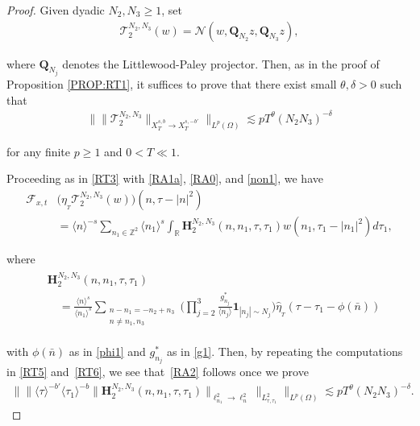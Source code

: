 \documentclass[%
11pt,  reqno]{amsart}
\newcommand{\1}{\hspace{0.2mm}\text{I}\hspace{0.2mm}}
\newcommand{\noi}{\noindent}
\newcommand{\Z}{\mathbb{Z}}
\newcommand{\R}{\mathbb{R}}
\newcommand{\Q}{\mathbf{Q}}
\newcommand{\F}{\mathcal{F}}
\newcommand{\dl}{\delta}
\newcommand{\ft}{\widehat}
\newcommand{\ta}{\theta}
\renewcommand{\l}{\ell}
\renewcommand{\O}{\Omega}
\newcommand{\les}{\lesssim}
\newcommand{\jb}[1]
{\langle #1 \rangle}
\newcommand{\ind}{\mathbf 1}
\newcommand{\NN}{\mathcal{N}}
\numberwithin{equation}{section}
\numberwithin{theorem}{section}
\newcommand{\Hb}{\mathbf{H}}
\newcommand{\TT}{\mathcal{T}}
\begin{document}
\begin{proof}



Given dyadic $N_2, N_3 \ge 1$, 
set 
\begin{align}
\TT_2^{N_2,N_3} (w) =  \NN(w, \Q_{N_2} z, \Q_{N_3} z), 
\label{RA1a}
\end{align}



\noi
where $\Q_{N_j}$ denotes the Littlewood-Paley projector.
Then, as in the proof of Proposition \ref{PROP:RT1}, 
it suffices to prove that 
there exist small $\ta, \dl > 0$ such that 
\begin{align}
\Big\| \| \TT_2^{N_2,N_3} \|_{X^{s,b}_T \to 
X^{s,-b'}_T} \Big\|_{L^p (\O)} 
\les p  T^\ta (N_2N_3)^{-\dl} 
\label{RA2}
\end{align}

\noi
for any finite $p \ge 1$ and $0 < T\ll 1$.



Proceeding as in \eqref{RT3} with 
\eqref{RA1a}, \eqref{RA0},  and \eqref{non1}, we have 
\begin{align*}
 \F_{x, t} &
\big(\eta_{_T} \TT_2^{N_2,N_3} (w)\big)
 (n,\tau -|n|^2) \\
&= \jb{n}^{-s} \sum_{n_1\in \Z^2 } \jb{n_1}^s 
\int_\R 
\Hb_2^{N_2, N_3} (n,n_1,\tau, \tau_1) 
 \ft w(n_1, \tau_1 - |n_1|^2) 
d\tau_1,
\end{align*} 

\noi
where 
\begin{align}
\begin{split}
& \Hb_2^{N_2, N_3} (n,n_1,\tau, \tau_1)  \\
& \quad =  \frac{\jb{n}^{s}}{ \jb{n_1}^{s}} 
\sum_{\substack{n - n_1 = - n_2 + n_3\\ n \neq n_1,n_3}} 
\bigg(\prod_{j = 2}^3 
\frac{g^*_{n_j} }{\jb{n_j}}
\ind_{|n_j|\sim N_j}\bigg)
\ft \eta_{_T} (\tau - \tau_1 - \phi (\bar n))  
\end{split}
\label{RA4}
\end{align}

\noi
with  $\phi (\bar n)$ as in \eqref{phi1}
and $g^*_{n_j}$ as in \eqref{g1}.
Then, 
by repeating the computations in 
\eqref{RT5} and~\eqref{RT6}, 
we see that~\eqref{RA2} follows once we prove
\begin{align}
\Big\| \big\| \jb{\tau}^{-b'} \jb{\tau_1}^{-b} \| \Hb_2^{N_2, N_3}  (n,n_1,\tau, \tau_1) \|_{\l^2_{n_1} \to \l^2_n} \big\|_{L^2_{\tau, \tau_1}} \Big\|_{L^p (\O)} 
 \les p  T^\ta (N_2N_3)^{-\dl} .
\label{RA7}
\end{align}






\end{proof}
\end{document}
